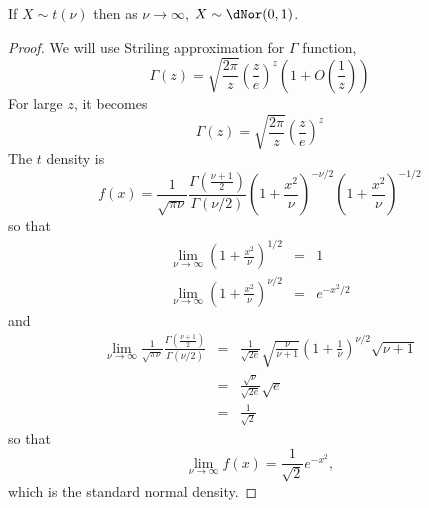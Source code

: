 \documentclass{article}
\begin{document}
\begin{prop}\label{c2p4}
If $X \sim t(\nu)$ then as $\nu \rightarrow \infty$, $X \sim \dNor(0, 1)$.
\end{prop}
\begin{proof}
We will use Striling approximation for $\Gamma$ function,
\begin{equation}\label{c2e22}
\Gamma(z) = \sqrt{\frac{2\pi}{z}}\left(\frac{z}{e}\right)^z
			\left(1 + O\left(\frac{1}{z}\right)\right)
\end{equation}
For large $z$, it becomes
\[
\Gamma(z) = \sqrt{\frac{2\pi}{z}}\left(\frac{z}{e}\right)^z
\]
The $t$ density is
\[
f(x) = \frac{1}{\sqrt{\pi\nu}}\frac{\Gamma(\frac{\nu+1}{2})}{\Gamma(\nu/2)}
	\left(1 + \frac{x^2}{\nu}\right)^{-\nu/2}\left(1 + \frac{x^2}{\nu}\right)^{-1/2}
\]
so that
\begin{eqnarray*}
\lim_{\nu\rightarrow\infty}\left(1 + \frac{x^2}{\nu}\right)^{1/2} &=& 1 \\
\lim_{\nu\rightarrow\infty}\left(1 + \frac{x^2}{\nu}\right)^{\nu/2} &=& e^{-x^2/2}
\end{eqnarray*}
and
\begin{eqnarray*}
\lim_{\nu\rightarrow\infty}\frac{1}{\sqrt{\pi\nu}}
\frac{\Gamma(\frac{\nu+1}{2})}{\Gamma(\nu/2)} &=& \frac{1}{\sqrt{2e}}
\sqrt{\frac{\nu}{\nu+1}}\left(1 + \frac{1}{\nu}\right)^{\nu/2}\sqrt{\nu+1} \\
 &=& \frac{\sqrt{\nu}}{\sqrt{2e}}\sqrt{e} \\
 &=& \frac{1}{\sqrt{2}}
\end{eqnarray*}
so that
\[
\lim_{\nu\rightarrow\infty}f(x) = \frac{1}{\sqrt{2}}e^{-x^2},
\]
which is the standard normal density.
\end{proof}
\end{document}
